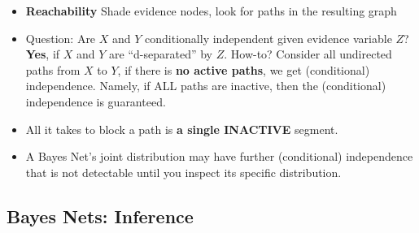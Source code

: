 \documentclass[twocolumn]{article}
\begin{document}
\begin{itemize}
  {}
\item \textbf{Reachability} Shade evidence nodes, look for paths in
  the resulting graph
\item Question: Are $X$ and $Y$ conditionally independent given
  evidence variable $Z$? \textbf{Yes}, if $X$ and $Y$ are
  ``d-separated'' by $Z$. How-to? Consider all undirected paths from
  $X$ to $Y$, if there is \textbf{no active paths}, we get (conditional)
  independence. Namely, if ALL paths are inactive, then the
  (conditional) independence is guaranteed.
\item All it takes to block a path is \textbf{a single INACTIVE}
  segment.
\item A Bayes Net's joint distribution may have further (conditional)
  independence that is not detectable until you inspect its specific
  distribution. 
\end{itemize}


\subsection{Bayes Nets: Inference}
\label{sec:bayes-nets:-infer}
\end{document}
